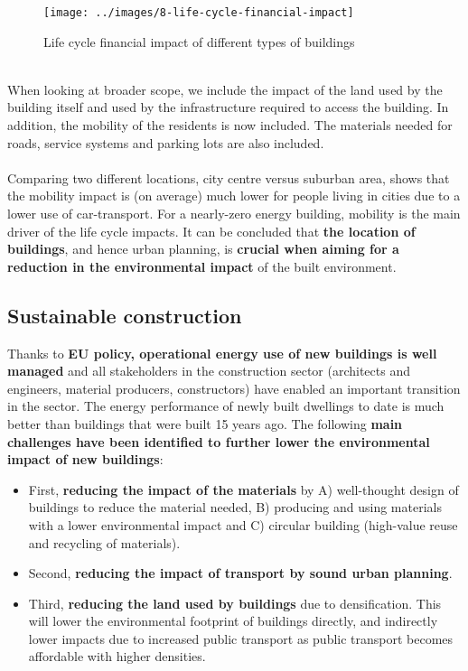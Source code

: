 \documentclass[../summary.tex]{subfiles}
\begin{document}
\begin{figure}[H]
	\centering
	\texttt{[image: ../images/8-life-cycle-financial-impact]}
	\caption{Life cycle financial impact of different types of buildings}
	\label{fig:life-cycle-financial-impact}
\end{figure}
\ \\
When looking at broader scope, we include the impact of the land used by the building itself and used by the infrastructure required to access the building. In addition, the mobility of the residents is now included. The materials needed for roads, service systems and parking lots are also included.
\\\\
Comparing two different locations, city centre versus suburban area, shows that the mobility impact is (on average) much lower for people living in cities due to a lower use of car-transport. For a nearly-zero energy building, mobility is the main driver of the life cycle impacts. It can be concluded that \textbf{the location of buildings}, and hence urban planning, is \textbf{crucial when aiming for a reduction in the environmental impact} of the built environment.

\subsection{Sustainable construction}

Thanks to \textbf{EU policy, operational energy use of new buildings is well managed} and all stakeholders in the construction sector (architects and engineers, material producers, constructors) have enabled an important transition in the sector. The energy performance of newly built dwellings to date is much better than buildings that were built 15 years ago. The following \textbf{main challenges have been identified to further lower the environmental impact of new buildings}:
\begin{itemize}
	\item First, \textbf{reducing the impact of the materials} by A) well-thought design of buildings to reduce the material needed, B) producing and using materials with a lower environmental impact and C) circular building (high-value reuse and recycling of materials).
	\item Second, \textbf{reducing the impact of transport by sound urban planning}.
	\item Third, \textbf{reducing the land used by buildings} due to densification. This will lower the environmental footprint of buildings directly, and indirectly lower impacts due to increased public transport as public transport becomes affordable with higher densities.
\end{itemize}
\end{document}
